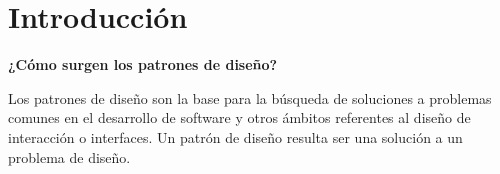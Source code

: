 \section{ Introducción} 
\textbf{¿Cómo surgen los patrones de diseño?}\\
\begin{flushleft}
Los patrones de diseño son la base para la búsqueda de soluciones a problemas comunes en el desarrollo de software y otros ámbitos referentes al diseño de interacción o interfaces.
Un patrón de diseño resulta ser una solución a un problema de diseño.
\end{flushleft}
